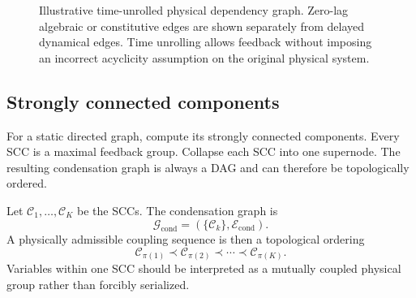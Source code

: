 \documentclass[11pt]{article}
\newcommand{\Gcal}{\mathcal{G}}
\newcommand{\Ecal}{\mathcal{E}}
\newcommand{\Evec}{\bm{E}}
\newcommand{\Jvec}{\bm{J}}
\newcommand{\dt}{\Delta t}
\begin{document}
\begin{figure}[H]
\centering
{}
\caption{Illustrative time-unrolled physical dependency graph. Zero-lag algebraic or constitutive edges are shown separately from delayed dynamical edges. Time unrolling allows feedback without imposing an incorrect acyclicity assumption on the original physical system.}
\label{fig:time_unrolled_physical_graph}
\end{figure}

\subsection{Strongly connected components}

For a static directed graph, compute its strongly connected components. Every SCC is a maximal feedback group. Collapse each SCC into one supernode. The resulting condensation graph is always a DAG and can therefore be topologically ordered.

Let \(\mathcal{C}_1,\ldots,\mathcal{C}_K\) be the SCCs. The condensation graph is
\begin{equation}
\Gcal_{\mathrm{cond}}=(\{\mathcal{C}_k\},\Ecal_{\mathrm{cond}}).
\end{equation}
A physically admissible coupling sequence is then a topological ordering
\begin{equation}
\mathcal{C}_{\pi(1)}\prec\mathcal{C}_{\pi(2)}\prec\cdots\prec\mathcal{C}_{\pi(K)}.
\end{equation}
Variables within one SCC should be interpreted as a mutually coupled physical group rather than forcibly serialized.
\end{document}
